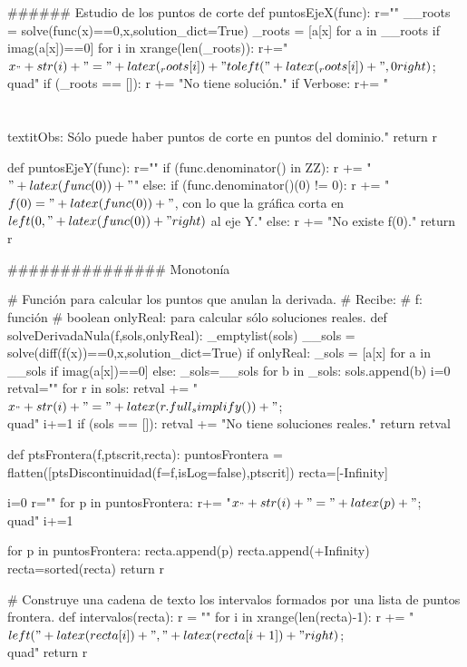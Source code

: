 \begin{sagesilent}
###### Estudio de los puntos de corte
def puntosEjeX(func):
    r=""
    __roots = solve(func(x)==0,x,solution_dict=True)
    _roots = [a[x] for a in __roots if imag(a[x])==0]
    for i in xrange(len(_roots)):
        r+="$x_"+str(i)+" = "+latex(_roots[i])+"\\to \\left("+latex(_roots[i])+",0\\right)$;\\quad"
    if (_roots == []):
        r += "No tiene solución."
    if Verbose:
        r+= "\\\\\\textit{Obs: Sólo puede haber puntos de corte en puntos del dominio.}"
    return r

def puntosEjeY(func):
    r=""
    if (func.denominator() in ZZ):
        r += "$" + latex(func(0)) +"$"
    else:
        if (func.denominator()(0) != 0):
            r += "$f(0) = " + latex(func(0)) + "$, con lo que la gráfica corta en $\\left(0,"+latex(func(0)) + "\\right)$ al eje Y."   
        else:
            r +=  "No existe f(0)."    
    return r


############### Monotonía


# Función para calcular los puntos que anulan la derivada.
# Recibe:
# f: función
# boolean onlyReal: para calcular sólo soluciones reales.
def solveDerivadaNula(f,sols,onlyReal):
    _emptylist(sols)
    __sols = solve(diff(f(x))==0,x,solution_dict=True)
    if onlyReal:
        _sols = [a[x] for a in __sols if imag(a[x])==0]
    else: 
        _sols=__sols
    for b in _sols:
        sols.append(b) 
    i=0
    retval=""
    for r in sols:
        retval += "$x_"+str(i)+" = "+latex(r.full_simplify())+"$;\\quad"
        i+=1
    if (sols == []):
        retval += "No tiene soluciones reales."
    return retval


def ptsFrontera(f,ptscrit,recta):
    puntosFrontera = flatten([ptsDiscontinuidad(f=f,isLog=false),ptscrit])
    recta=[-Infinity]

    i=0
    r=""
    for p in puntosFrontera:
        r+= "$x_"+str(i)+"="+latex(p)+"$;\\quad"
        i+=1

    for p in puntosFrontera:
        recta.append(p)
    recta.append(+Infinity)
    recta=sorted(recta)
    return r

# Construye una cadena de texto los intervalos formados por una lista de puntos frontera.
def intervalos(recta):
    r = ""
    for i in xrange(len(recta)-1):
        r += "$\\left("+latex(recta[i])+","+latex(recta[i+1])+"\\right)$;\\quad"  
    return r


\end{sagesilent}
